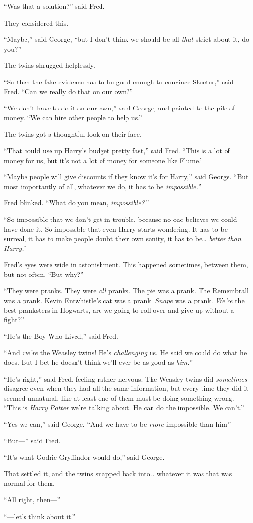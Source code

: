 ``Was that a solution?'' said Fred.

They considered this.

``Maybe,'' said George, ``but I don't think we should be all \emph{that}
strict about it, do you?''

The twins shrugged helplessly.

``So then the fake evidence has to be good enough to convince Skeeter,''
said Fred. ``Can we really do that on our own?''

``We don't have to do it on our own,'' said George, and pointed to the
pile of money. ``We can hire other people to help us.''

The twins got a thoughtful look on their face.

``That could use up Harry's budget pretty fast,'' said Fred. ``This is a
lot of money for us, but it's not a lot of money for someone like
Flume.''

``Maybe people will give discounts if they know it's for Harry,'' said
George. ``But most importantly of all, whatever we do, it has to be
\emph{impossible.}''

Fred blinked. ``What do you mean, \emph{impossible?''}

``So impossible that we don't get in trouble, because no one believes we
could have done it. So impossible that even Harry starts wondering. It
has to be surreal, it has to make people doubt their own sanity, it has
to be\ldots{} \emph{better than Harry.}''

Fred's eyes were wide in astonishment. This happened sometimes, between
them, but not often. ``But why?''

``They were pranks. They were \emph{all} pranks. The pie was a prank.
The Remembrall was a prank. Kevin Entwhistle's cat was a prank.
\emph{Snape} was a prank. \emph{We're} the best pranksters in Hogwarts,
are we going to roll over and give up without a fight?''

``He's the Boy-Who-Lived,'' said Fred.

``And \emph{we're} the Weasley twins! He's \emph{challenging} us. He
said we could do what he does. But I bet he doesn't think we'll ever be
as good as \emph{him.}''

``He's right,'' said Fred, feeling rather nervous. The Weasley twins did
\emph{sometimes} disagree even when they had all the same information,
but every time they did it seemed unnatural, like at least one of them
must be doing something wrong. ``This is \emph{Harry Potter} we're
talking about. He can do the impossible. We can't.''

``Yes we can,'' said George. ``And we have to be \emph{more} impossible
than him.''

``But---'' said Fred.

``It's what Godric Gryffindor would do,'' said George.

That settled it, and the twins snapped back into\ldots{} whatever it was
that was normal for them.

``All right, then---''

``---let's think about it.''
